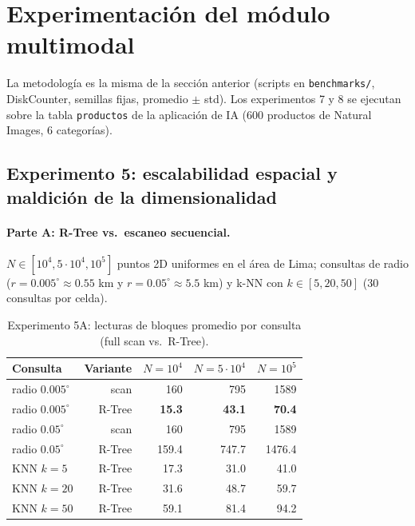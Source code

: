 \documentclass[11pt]{article}
\begin{document}
\section{Experimentación del módulo multimodal}

La metodología es la misma de la sección anterior (scripts en
\texttt{benchmarks/}, DiskCounter, semillas fijas, promedio $\pm$ std).
Los experimentos 7 y 8 se ejecutan sobre la tabla \texttt{productos} de la
aplicación de IA (600 productos de Natural Images, 6 categorías).

\subsection{Experimento 5: escalabilidad espacial y maldición de la
dimensionalidad}

\paragraph{Parte A: R-Tree vs.\ escaneo secuencial.}
$N \in [10^4, 5\cdot10^4, 10^5]$ puntos 2D uniformes en el área de Lima;
consultas de radio ($r = 0.005^\circ \approx 0.55$ km y $r = 0.05^\circ
\approx 5.5$ km) y k-NN con $k \in [5, 20, 50]$ (30 consultas por celda).

\begin{table}[!htb]
\centering
\caption{Experimento 5A: lecturas de bloques promedio por consulta
(full scan vs.\ R-Tree).}
\label{tab:exp5a}
\begin{tabular}{@{}lrrrr@{}}
\toprule
\rowcolor{utecblue!10}\textbf{Consulta} & \textbf{Variante} &
$N{=}10^4$ & $N{=}5\cdot10^4$ & $N{=}10^5$ \\
\midrule
radio $0.005^\circ$ & scan  & 160   & 795    & 1589   \\
radio $0.005^\circ$ & R-Tree & \textbf{15.3}  & \textbf{43.1}   & \textbf{70.4}   \\
radio $0.05^\circ$  & scan  & 160   & 795    & 1589   \\
radio $0.05^\circ$  & R-Tree & 159.4 & 747.7  & 1476.4 \\
KNN $k{=}5$         & R-Tree & 17.3  & 31.0   & 41.0   \\
KNN $k{=}20$        & R-Tree & 31.6  & 48.7   & 59.7   \\
KNN $k{=}50$        & R-Tree & 59.1  & 81.4   & 94.2   \\
\bottomrule
\end{tabular}
\end{table}
\end{document}
